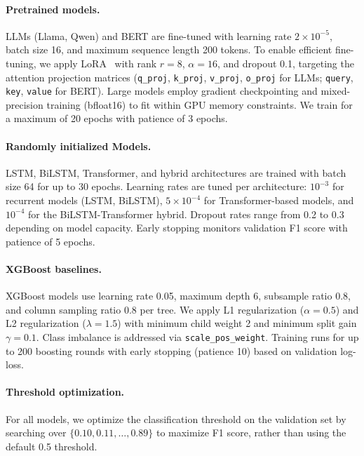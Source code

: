 \documentclass{article}
\theoremstyle{plain}
\theoremstyle{definition}
\theoremstyle{remark}
\begin{document}
\paragraph{Pretrained models.}
LLMs (Llama, Qwen) and BERT are fine-tuned with learning rate $2 \times 10^{-5}$, batch size 16, and maximum sequence length 200 tokens. To enable efficient fine-tuning, we apply LoRA~\citep{LoRA} with rank $r=8$, $\alpha=16$, and dropout 0.1, targeting the attention projection matrices (\texttt{q\_proj}, \texttt{k\_proj}, \texttt{v\_proj}, \texttt{o\_proj} for LLMs; \texttt{query}, \texttt{key}, \texttt{value} for BERT). Large models employ gradient checkpointing and mixed-precision training (bfloat16) to fit within GPU memory constraints. We train for a maximum of 20 epochs with patience of 3 epochs.

\paragraph{Randomly initialized Models.}
LSTM, BiLSTM, Transformer, and hybrid architectures are trained with batch size 64 for up to 30 epochs. Learning rates are tuned per architecture: $10^{-3}$ for recurrent models (LSTM, BiLSTM), $5 \times 10^{-4}$ for Transformer-based models, and $10^{-4}$ for the BiLSTM-Transformer hybrid. Dropout rates range from 0.2 to 0.3 depending on model capacity. Early stopping monitors validation F1 score with patience of 5 epochs.

\paragraph{XGBoost baselines.}
XGBoost models use learning rate 0.05, maximum depth 6, subsample ratio 0.8, and column sampling ratio 0.8 per tree. We apply L1 regularization ($\alpha=0.5$) and L2 regularization ($\lambda=1.5$) with minimum child weight 2 and minimum split gain $\gamma=0.1$. Class imbalance is addressed via \texttt{scale\_pos\_weight}. Training runs for up to 200 boosting rounds with early stopping (patience 10) based on validation log-loss.

\paragraph{Threshold optimization.}
For all models, we optimize the classification threshold on the validation set by searching over $\{0.10, 0.11, \ldots, 0.89\}$ to maximize F1 score, rather than using the default 0.5 threshold.
\end{document}
